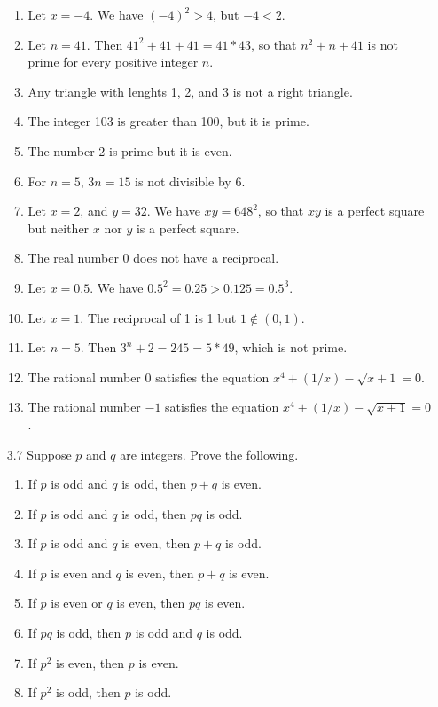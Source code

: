 \begin{enumerate}
      \begin{enumerate}
         \item Let $x = -4$. We have $(-4)^2 > 4$, but $-4 < 2$.
         \item Let $n = 41$. Then $41^2 + 41 + 41 = 41 * 43$, so that
               $n^2 + n + 41$ is not prime for every positive integer $n$.
         \item Any triangle with lenghts 1, 2, and 3 is not a right triangle.
         \item The integer 103 is greater than 100, but it is prime.
         \item The number 2 is prime but it is even.
         \item For $n = 5$, $3n = 15$ is not divisible by 6.
         \item Let $x = 2$, and $y = 32$. We have $xy = 64 8^2$, so that $xy$
               is a perfect square but neither $x$ nor $y$ is a perfect square.
         \item The real number 0 does not have a reciprocal.
         \item Let $x = 0.5$. We have $0.5^2 = 0.25 > 0.125 = 0.5^3$.
         \item Let $x = 1$. The reciprocal of 1 is 1 but $1 \notin (0, 1)$.
         \item Let $n = 5$. Then $3^n + 2 = 245 = 5 * 49$, which is not prime.
         \item The rational number 0 satisfies the equation 
               $x^4 + (1/x) - \sqrt{x + 1} = 0$.
         \item The rational number $-1$ satisfies the equation 
               $x^4 + (1/x) - \sqrt{x + 1} = 0$.
      \end{enumerate}
   \item[3.7] Suppose $p$ and $q$ are integers. Prove the following.

      \begin{enumerate}
         \item If $p$ is odd and $q$ is odd, then $p + q$ is even.
         \item If $p$ is odd and $q$ is odd, then $pq$ is odd.
         \item If $p$ is odd and $q$ is even, then $p + q$ is odd.
         \item If $p$ is even and $q$ is even, then $p + q$ is even.
         \item If $p$ is even or $q$ is even, then $pq$ is even.
         \item If $pq$ is odd, then $p$ is odd and $q$ is odd.
         \item If $p^2$ is even, then $p$ is even.
         \item If $p^2$ is odd, then $p$ is odd.
      \end{enumerate}


\end{enumerate}

